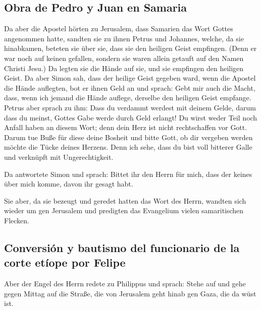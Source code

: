 \hypertarget{obra-de-pedro-y-juan-en-samaria}{%
\subsection{Obra de Pedro y Juan en
Samaria}\label{obra-de-pedro-y-juan-en-samaria}}

 Da aber die Apostel hörten zu Jerusalem, dass Samarien
das Wort Gottes angenommen hatte, sandten sie zu ihnen Petrus und
Johannes,  welche, da sie hinabkamen, beteten sie über
sie, dass sie den heiligen Geist empfingen.  (Denn er war
noch auf keinen gefallen, sondern sie waren allein getauft auf den Namen
Christi Jesu.)  Da legten sie die Hände auf sie, und sie
empfingen den heiligen Geist.  Da aber Simon sah, dass
der heilige Geist gegeben ward, wenn die Apostel die Hände auflegten,
bot er ihnen Geld an  und sprach: Gebt mir auch die
Macht, dass, wenn ich jemand die Hände auflege, derselbe den heiligen
Geist empfange.  Petrus aber sprach zu ihm: Dass du
verdammt werdest mit deinem Gelde, darum dass du meinst, Gottes Gabe
werde durch Geld erlangt!  Du wirst weder Teil noch
Anfall haben an diesem Wort; denn dein Herz ist nicht rechtschaffen vor
Gott.  Darum tue Buße für diese deine Bosheit und bitte
Gott, ob dir vergeben werden möchte die Tücke deines Herzens.
 Denn ich sehe, dass du bist voll bitterer Galle und
verknüpft mit Ungerechtigkeit.

 Da antwortete Simon und sprach: Bittet ihr den Herrn für
mich, dass der keines über mich komme, davon ihr gesagt habt.

 Sie aber, da sie bezeugt und geredet hatten das Wort des
Herrn, wandten sich wieder um gen Jerusalem und predigten das Evangelium
vielen samaritischen Flecken.

\hypertarget{conversiuxf3n-y-bautismo-del-funcionario-de-la-corte-etuxedope-por-felipe}{%
\subsection{Conversión y bautismo del funcionario de la corte etíope por
Felipe}\label{conversiuxf3n-y-bautismo-del-funcionario-de-la-corte-etuxedope-por-felipe}}

 Aber der Engel des Herrn redete zu Philippus und sprach:
Stehe auf und gehe gegen Mittag auf die Straße, die von Jerusalem geht
hinab gen Gaza, die da wüst ist.

